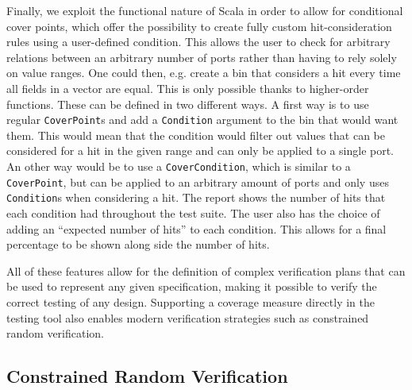 \documentclass[conference]{IEEEtran}
\newcommand{\martin}[1]{{\color{blue} Martin: #1}}
\renewcommand{\martin}[1]{}
\begin{document}
Finally, we exploit the functional nature of Scala in order to allow for conditional cover points, which offer the possibility to create fully custom hit-consideration rules using a user-defined condition. 
This allows the user to check for arbitrary relations between an arbitrary number of ports rather than having to rely solely on value ranges. 
One could then, e.g. create a bin that considers a hit every time all fields in a vector are equal. 
This is only possible thanks to higher-order functions. 
These can be defined in two different ways. 
A first way is to use regular \texttt{CoverPoint}s and add a \texttt{Condition} argument to the bin that would want them. 
This would mean that the condition would filter out values that can be considered for a hit in the given range and can only be applied to a single port. 
An other way would be to use a \texttt{CoverCondition}, which is similar to a \texttt{CoverPoint}, but can be applied to an arbitrary amount of ports and only uses \texttt{Condition}s when considering a hit.
The report shows the number of hits that each condition had throughout the test suite.
The user also has the choice of adding an ``expected number of hits'' to each condition.
This allows for a final percentage to be shown along side the number of hits.

All of these features allow for the definition of complex verification plans that can be used to represent any given specification, making it possible to verify the correct testing of any design.
Supporting a coverage measure directly in the testing tool also enables modern verification strategies such as constrained random verification.

\subsection{Constrained Random Verification}

\martin{We never mention that we are using someone elses solver. This is on
the boarder to cheating.}
\end{document}
